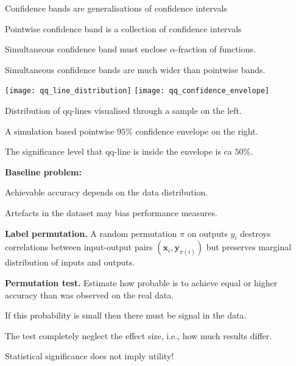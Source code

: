\documentclass[landscape,footrule]{foils}
\renewcommand{\vec}[1]{\boldsymbol{#1}}
\begin{document}
Confidence bands are generalisations of confidence intervals
\begin{triangles}
\item Pointwise confidence band is a collection of confidence intervals
\item Simultaneous confidence band must enclose $\alpha$-fraction of functions.  
\item Simultaneous confidence bands are much wider than pointwise bands.  
\end{triangles}


\enlargethispage{0.5cm}
\centerline{
\texttt{[image: qq\_line\_distribution]}
\texttt{[image: qq\_confidence\_envelope]}}
\begin{triangles}
\item Distribution of qq-lines visualised through a sample on the left.
\item A simulation based pointwise $95\%$ confidence envelope on the right.
\item The significance level that qq-line is inside the envelope is ca $50\%$.
\end{triangles}


\textbf{Baseline problem:}
\begin{triangles}
\item Achievable accuracy depends on the data distribution. 
\item Artefacts in the dataset may bias performance measures.
\end{triangles}
\vspace*{2ex}

\textbf{Label permutation.}
A random permutation $\pi$ on outputs $y_i$ destroys correlations between input-output pairs $(\vec{x}_{i}, \vec{y}_{\pi(i)})$ but preserves marginal distribution of inputs and outputs. 
\vspace*{2ex}


\textbf{Permutation test.}
Estimate how probable is to achieve equal or higher accuracy than was observed on the real data.
\begin{triangles}
\item If this probability is small then there must be signal in the data. 
\item The test completely neglect the effect size, i.e., how much results differ.
\item Statistical significance does not imply utility!      
\end{triangles}  
\end{document}
